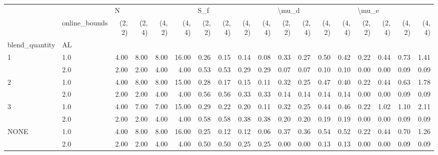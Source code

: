 \begin{tabular}{llrrrrrrrrrrrrrrrr}
\toprule
     & {} & \multicolumn{4}{l}{N} & \multicolumn{4}{l}{S\_f} & \multicolumn{4}{l}{\textbackslash mu\_d} & \multicolumn{4}{l}{\textbackslash mu\_e} \\
     & online\_bounds & (2, 2) & (2, 4) & (4, 2) & (4, 4) & (2, 2) & (2, 4) & (4, 2) & (4, 4) & (2, 2) & (2, 4) & (4, 2) & (4, 4) & (2, 2) & (2, 4) & (4, 2) & (4, 4) \\
blend\_quantity & AL &        &        &        &        &        &        &        &        &        &        &        &        &        &        &        &        \\
\midrule
1 & 1.0 &   4.00 &   8.00 &   8.00 &  16.00 &   0.26 &   0.15 &   0.14 &   0.08 &   0.33 &   0.27 &   0.50 &   0.42 &   0.22 &   0.44 &   0.73 &   1.41 \\
     & 2.0 &   2.00 &   2.00 &   4.00 &   4.00 &   0.53 &   0.53 &   0.29 &   0.29 &   0.07 &   0.07 &   0.10 &   0.10 &   0.00 &   0.00 &   0.09 &   0.09 \\
2 & 1.0 &   4.00 &   8.00 &   8.00 &  15.00 &   0.28 &   0.17 &   0.15 &   0.11 &   0.32 &   0.25 &   0.47 &   0.40 &   0.22 &   0.44 &   0.63 &   1.78 \\
     & 2.0 &   2.00 &   2.00 &   4.00 &   4.00 &   0.56 &   0.56 &   0.33 &   0.33 &   0.14 &   0.14 &   0.14 &   0.14 &   0.00 &   0.00 &   0.09 &   0.09 \\
3 & 1.0 &   4.00 &   7.00 &   7.00 &  15.00 &   0.29 &   0.22 &   0.20 &   0.11 &   0.32 &   0.25 &   0.44 &   0.46 &   0.22 &   1.02 &   1.10 &   2.11 \\
     & 2.0 &   2.00 &   2.00 &   4.00 &   4.00 &   0.58 &   0.58 &   0.38 &   0.38 &   0.20 &   0.20 &   0.19 &   0.19 &   0.00 &   0.00 &   0.09 &   0.09 \\
NONE & 1.0 &   4.00 &   8.00 &   8.00 &  16.00 &   0.25 &   0.12 &   0.12 &   0.06 &   0.37 &   0.36 &   0.54 &   0.52 &   0.22 &   0.44 &   0.70 &   1.26 \\
     & 2.0 &   2.00 &   2.00 &   4.00 &   4.00 &   0.50 &   0.50 &   0.25 &   0.25 &   0.00 &   0.00 &   0.13 &   0.13 &   0.00 &   0.00 &   0.09 &   0.09 \\
\bottomrule
\end{tabular}
